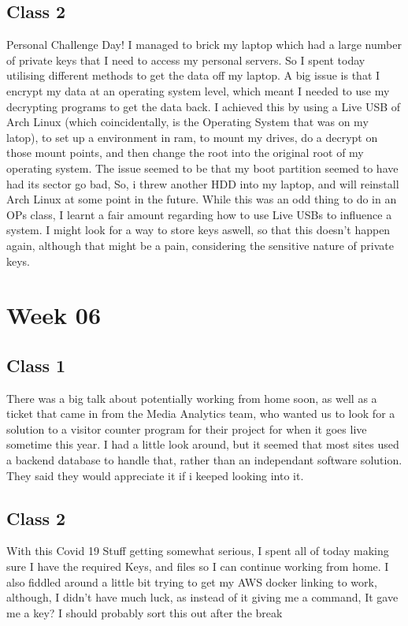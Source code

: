 \documentclass{article}
\begin{document}
\subsection{Class 2}
Personal Challenge Day! I managed to brick my laptop which had a large number of private keys that I need to access my personal servers.
So I spent today utilising different methods to get the data off my laptop. A big issue is that I encrypt my data at an operating system
level, which meant I needed to use my decrypting programs to get the data back. I achieved this by using a Live USB of Arch Linux (which
coincidentally, is the Operating System that was on my latop), to set up a environment in ram, to mount my drives, do a decrypt on those
mount points, and then change the root into the original root of my operating system. The issue seemed to be that my boot partition seemed
to have had its sector go bad, So, i threw another HDD into my laptop, and will reinstall Arch Linux at some point in the future. While
this was an odd thing to do in an OPs class, I learnt a fair amount regarding how to use Live USBs to influence a system. I might look
for a way to store keys aswell, so that this doesn't happen again, although that might be a pain, considering the sensitive nature of private
keys.
\section{Week 06}
\subsection{Class 1}
There was a big talk about potentially working from home soon, as well as a ticket that came in from the Media Analytics team, who
wanted us to look for a solution to a visitor counter program for their project for when it goes live sometime this year. I had a little
look around, but it seemed that most sites used a backend database to handle that, rather than an independant software solution. They
said they would appreciate it if i keeped looking into it.
\subsection{Class 2}
With this Covid 19 Stuff getting somewhat serious, I spent all of today making sure I have the required Keys, and files so I can continue 
working from home. I also fiddled around a little bit trying to get my AWS docker linking to work, although, I didn't have much luck, as 
instead of it giving me a command, It gave me a key? I should probably sort this out after the break
\end{document}
